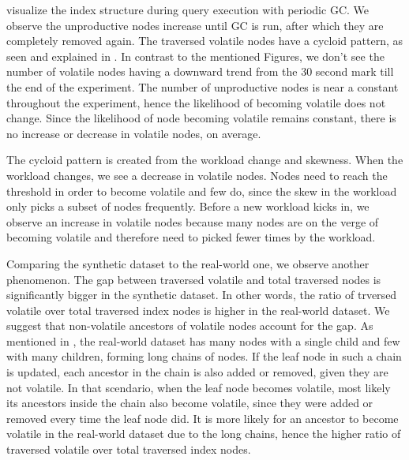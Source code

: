\documentclass[abstracton,12pt]{scrartcl}
\theoremstyle{definition}
\begin{document}
 visualize the index
structure during query execution with periodic GC. We observe the unproductive
nodes increase until GC is run, after which they are completely removed again. 
The traversed volatile nodes have a cycloid pattern, as seen and explained in
.
In contrast to the mentioned Figures, we don't see the number of volatile nodes
having a downward trend from the 30 second mark till the end of the experiment.
The number of unproductive nodes is near a
constant throughout the experiment, hence the likelihood of becoming volatile does not
change. Since the likelihood of node becoming volatile remains constant, there is no
increase or decrease in volatile nodes, on average.

The cycloid pattern is created from the workload change and skewness.
When the workload changes, we see a decrease in volatile nodes. Nodes need to
reach the threshold in order to become volatile and few do, since the skew in
the workload only picks a subset of nodes frequently. Before a new workload
kicks in, we observe an increase in volatile nodes because many nodes are on the
verge of becoming volatile and therefore need to picked fewer times by the
workload.

Comparing the synthetic dataset to the real-world one, we observe another phenomenon.
The gap between traversed volatile and total traversed nodes is significantly bigger
in the synthetic dataset. In other words, the ratio of trversed volatile over total 
traversed index nodes is higher in the real-world dataset. We suggest that non-volatile
ancestors of volatile nodes account for the gap. As mentioned in ,
the real-world dataset has many nodes with a single child and few with many children,
forming long chains of nodes. If the leaf node in such a chain is updated, each 
ancestor in the chain is also added or removed, given they are not volatile. In that scendario,
when the leaf node becomes volatile, most likely its ancestors inside the chain also become
volatile, since they were added or removed every time the leaf node did. It is more likely
for an ancestor to become volatile in the real-world dataset due to the long chains, hence
the higher ratio of traversed volatile over total traversed index nodes.
\end{document}

